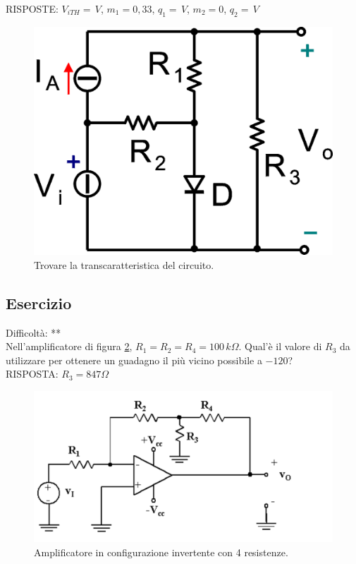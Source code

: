 \documentclass[a4paper,portrait,12pt]{article}
\theoremstyle{definition}
\begin{document}
RISPOSTE: $V_{iTH} = \,V$, $m_1 = 0,33$, $q_1 = \,V$, $m_2 = 0$, $q_2 = \,V$

\begin{figure}[H]
\centering
\includegraphics[width=.3\linewidth]{img/elettronicaEs/transdiodo3.pdf}
\caption{Trovare la transcaratteristica del circuito.}
\label{img:transdiodo3}
\end{figure}


\subsection{Esercizio}

Difficoltà: **\\

Nell'amplificatore di figura \ref{img:invertente4R}, $R_1 = R_2 = R_4 = 100\,k\Omega$. Qual'è il valore di 
$R_3$ da utilizzare per ottenere un guadagno il più vicino possibile a $-120$?\\

RISPOSTA: $R_3 = 847 \Omega$

\begin{figure}[H]
\centering
\includegraphics[width=.4\linewidth]{img/elettronicaEs/invertente4R.pdf}
\caption{Amplificatore in configurazione invertente con 4 resistenze.}
\label{img:invertente4R}
\end{figure}
\end{document}
